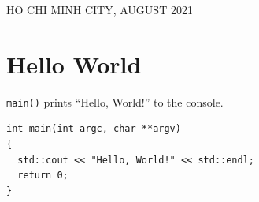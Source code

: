 \documentclass[a4paper]{article}
\numberwithin{equation}{section}
\begin{document}
\begin{titlepage}
  \begin{center}
    {\footnotesize HO CHI MINH CITY, AUGUST 2021}
  \end{center}
\end{titlepage}



\newpage
\tableofcontents
\newpage

\section{Hello World}
\texttt{main()} prints ``Hello, World!'' to the console.
\begin{mdframed}[leftline=false,rightline=false,backgroundcolor=magenta!10,nobreak=false]
  \begin{verbatim}
int main(int argc, char **argv)
{
  std::cout << "Hello, World!" << std::endl;
  return 0;
}
  \end{verbatim}
\end{mdframed}
\end{document}
